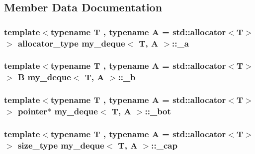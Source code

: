 \subsection{Member Data Documentation}
\hypertarget{classmy__deque_ab2ba2e14114a27b2f91e47dfccabc639}{
\subsubsection[{\-\_\-a}]{\setlength{\rightskip}{0pt plus 5cm}template$<$typename T , typename A  = std\-::allocator$<$\-T$>$$>$ {\bf allocator\-\_\-type} {\bf my\-\_\-deque}$<$ T, A $>$\-::\-\_\-a\hspace{0.3cm}{\ttfamily [private]}}}\label{classmy__deque_ab2ba2e14114a27b2f91e47dfccabc639}
\hypertarget{classmy__deque_a365667310d1858fdfbb4d4e95a98fdf6}{
\subsubsection[{\-\_\-b}]{\setlength{\rightskip}{0pt plus 5cm}template$<$typename T , typename A  = std\-::allocator$<$\-T$>$$>$ {\bf B} {\bf my\-\_\-deque}$<$ T, A $>$\-::\-\_\-b\hspace{0.3cm}{\ttfamily [private]}}}\label{classmy__deque_a365667310d1858fdfbb4d4e95a98fdf6}
\hypertarget{classmy__deque_a660b684ccc6255e2ef95898775ae8705}{
\subsubsection[{\-\_\-bot}]{\setlength{\rightskip}{0pt plus 5cm}template$<$typename T , typename A  = std\-::allocator$<$\-T$>$$>$ {\bf pointer}$\ast$ {\bf my\-\_\-deque}$<$ T, A $>$\-::\-\_\-bot\hspace{0.3cm}{\ttfamily [private]}}}\label{classmy__deque_a660b684ccc6255e2ef95898775ae8705}
\hypertarget{classmy__deque_af094477b579ee653b6e11097611952a3}{
\subsubsection[{\-\_\-cap}]{\setlength{\rightskip}{0pt plus 5cm}template$<$typename T , typename A  = std\-::allocator$<$\-T$>$$>$ {\bf size\-\_\-type} {\bf my\-\_\-deque}$<$ T, A $>$\-::\-\_\-cap\hspace{0.3cm}{\ttfamily [private]}}}\label{classmy__deque_af094477b579ee653b6e11097611952a3}
